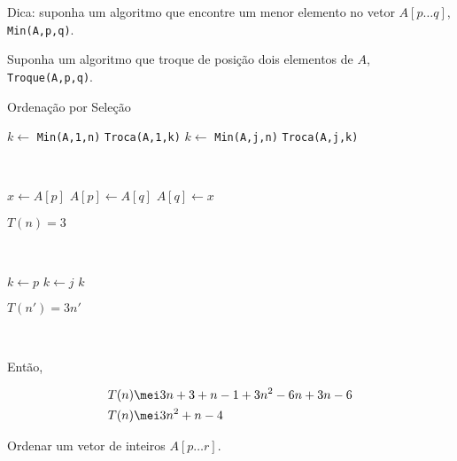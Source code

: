 \documentclass[a4paper]{memoir}
\begin{document}
\begin{sol}
Dica: suponha um algoritmo que encontre um menor elemento no vetor $A[p \ldots q]$, \texttt{Min(A,p,q)}.

Suponha um algoritmo que troque de posição dois elementos de $A$,\\
\texttt{Troque(A,p,q)}.

\begin{algorithm}
\caption*{Ordenação por Seleção}
\begin{algorithmic}[1]
 
  \State $k \gets$ \texttt{Min(A,1,n)} 
  \State \texttt{Troca(A,1,k)} 
   
    \State $k \gets$  \texttt{Min(A,j,n)} 
    \State \texttt{Troca(A,j,k)} 
  \EndFor
\EndFunction
\end{algorithmic}
\end{algorithm}

\

\begin{algorithmic}[1]
  \State $x \gets A[p]$
  \State $A[p] \gets A[q]$
  \State $A[q] \gets x$
\EndFunction
\end{algorithmic}

$T(n) = 3$

\

\begin{algorithmic}[1]
 
  \State $k \gets p$ 
   
     
      \State $k \gets j$ 
    \EndIf
    \State \Return $k$ 
  \EndFor
\EndFunction
\end{algorithmic}

$T(n') = 3n'$

\

Então,

\[
\begin{gathered}
  T(n) \mei 3n + 3 + n - 1 + 3n^2  - 6n + 3n - 6 \hfill \\
  T(n) \mei 3n^2  + n - 4 \hfill \\ 
\end{gathered} 
\]

\end{sol}

\newpage

\begin{ex}
Ordenar um vetor de inteiros $A[p \ldots r]$.
\end{ex}
\end{document}
